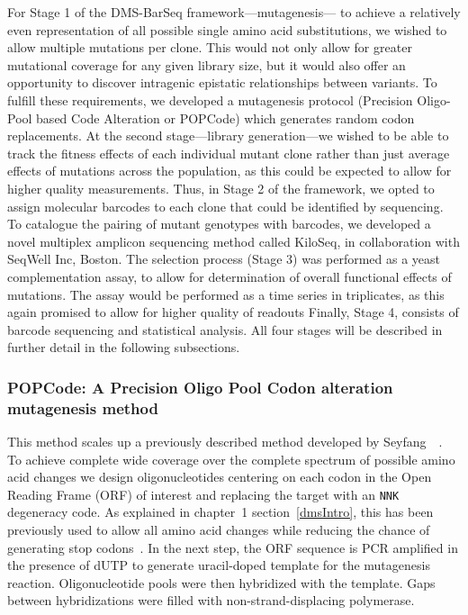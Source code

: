 For Stage 1 of the DMS-BarSeq framework---mutagenesis--- to achieve a relatively even representation of all possible single amino acid substitutions, we wished to allow multiple mutations per clone. This would not only allow for greater mutational coverage for any given library size, but it would also offer an opportunity to discover intragenic epistatic relationships between variants.  To fulfill these requirements, we developed a mutagenesis protocol (Precision Oligo-Pool based Code Alteration or POPCode) which generates random codon replacements. 
At the second stage---library generation---we wished to be able to track the fitness effects of each individual mutant clone rather than just average effects of mutations across the population, as this could be expected to allow for higher quality measurements. Thus, in Stage 2 of the framework, we opted to assign molecular barcodes to each clone that could be identified by sequencing. To catalogue the pairing of mutant genotypes with barcodes, we developed a novel multiplex amplicon sequencing method called KiloSeq, in collaboration with SeqWell Inc, Boston. 
The selection process (Stage 3) was performed as a yeast complementation assay, to allow for determination of overall functional effects of mutations. The assay would be performed as a time series in triplicates, as this again promised to allow for higher quality of readouts 
Finally, Stage 4, consists of barcode sequencing and statistical analysis. All four stages will be described in further detail in the following subsections.


\subsubsection{POPCode: A Precision Oligo Pool Codon alteration mutagenesis method}

This method scales up a previously described method developed by Seyfang~\etal~\cite{seyfang_multiple_2004}. To achieve complete wide coverage over the complete spectrum of possible amino acid changes we design oligonucleotides centering on each codon in the Open Reading Frame (ORF) of interest and replacing the target with an \texttt{NNK} degeneracy code. As explained in chapter~1 section~\ref{dmsIntro}, this has been previously used to allow all amino acid changes while reducing the chance of generating stop codons~\cite{pal_methods_2005}. 
In the next step, the ORF sequence is PCR amplified in the presence of dUTP to generate uracil-doped template for the mutagenesis reaction. Oligonucleotide pools were then hybridized with the template. Gaps between hybridizations were filled with non-strand-displacing polymerase. 

